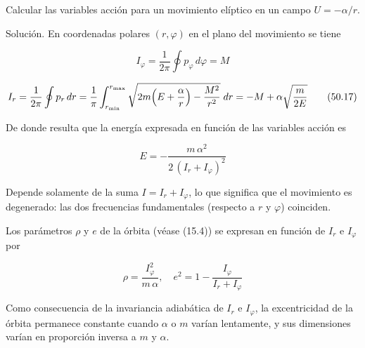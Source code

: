 \documentclass[12pt]{article}
\begin{document}
Calcular las variables acción para un movimiento elíptico en un campo \(U=-\alpha/r\).

Solución. En coordenadas polares \((r,\varphi)\) en el plano del movimiento se tiene

\[
I_{\varphi}
= \frac{1}{2\pi}\oint p_{\varphi}\,d\varphi
= M
\tag{50.16}
\]

\[
I_{r}
= \frac{1}{2\pi}\oint p_{r}\,dr
= \frac{1}{\pi}\int_{r_{\min}}^{r_{\max}}
    \sqrt{2m\Bigl(E+\frac{\alpha}{r}\Bigr)-\frac{M^{2}}{r^{2}}}\;dr
= -M + \alpha\sqrt{\frac{m}{2E}}
\tag{50.17}
\]

De donde resulta que la energía expresada en función de las variables acción es

\[
E = -\frac{m\,\alpha^{2}}{2\,(I_{r}+I_{\varphi})^{2}}
\tag{50.18}
\]

Depende solamente de la suma \(I = I_{r}+I_{\varphi}\), lo que significa que el movimiento es degenerado: las dos frecuencias fundamentales (respecto a \(r\) y \(\varphi\)) coinciden.

Los parámetros \(\rho\) y \(e\) de la órbita (véase (15.4)) se expresan en función de \(I_{r}\) e \(I_{\varphi}\) por

\[
\rho = \frac{I_{\varphi}^{2}}{m\,\alpha},
\quad
e^{2} = 1 - \frac{I_{\varphi}}{I_{r}+I_{\varphi}}
\tag{50.19}
\]

Como consecuencia de la invariancia adiabática de \(I_{r}\) e \(I_{\varphi}\), la excentricidad de la órbita permanece constante cuando \(\alpha\) o \(m\) varían lentamente, y sus dimensiones varían en proporción inversa a \(m\) y \(\alpha\).
\end{document}
